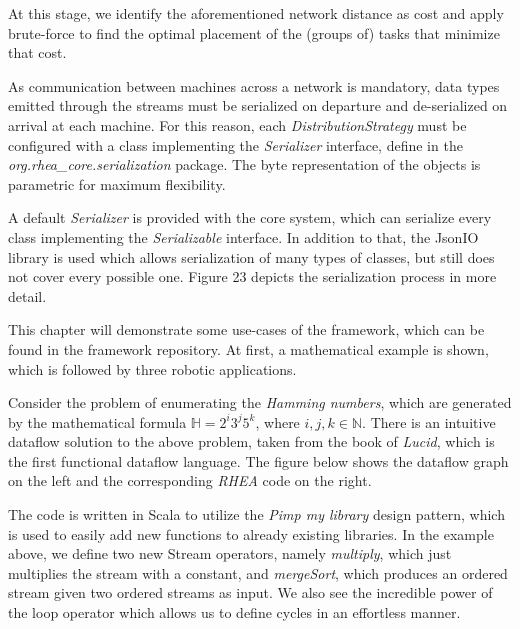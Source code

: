 \documentclass{dithesis}
\begin{document}
At this stage, we identify the aforementioned network distance as cost and apply brute-force to find the optimal placement of the (groups of) tasks that minimize that cost.


As communication between machines across a network is mandatory, data types emitted through the streams must be serialized on departure and de-serialized on arrival at each machine. For this reason, each \textit{DistributionStrategy} must be configured with a class implementing the \textit{Serializer} interface, define in the \textit{org.rhea\_core.serialization} package. The byte representation of the objects is parametric for maximum flexibility. 

A default \textit{Serializer} is provided with the core system, which can serialize every class implementing the \textit{Serializable} interface. In addition to that, the JsonIO library is used which allows serialization of many types of classes, but still does not cover every possible one. Figure 23 depicts the serialization process in more detail.


This chapter will demonstrate some use-cases of the framework, which can be found in the framework repository. At first, a mathematical example is shown, which is followed by three robotic applications. 

Consider the problem of enumerating the \textit{Hamming numbers}, which are generated by the mathematical formula $\mathbb{H} = 2^i3^j5^k$, where $i,j,k \in \mathbb{N}$. There is an intuitive dataflow solution to the above problem, taken from the book of \textit{Lucid}, which is the first functional dataflow language\cite{lucid}. The figure below shows the dataflow graph on the left and the corresponding \textit{RHEA} code on the right.


The code is written in Scala to utilize the \textit{Pimp my library} design pattern\cite{pimp}, which is used to easily add new functions to already existing libraries. In the example above, we define two new Stream operators, namely \textit{multiply}, which just multiplies the stream with a constant, and \textit{mergeSort}, which produces an ordered stream given two ordered streams as input. We also see the incredible power of the loop operator which allows us to define cycles in an effortless manner.
\end{document}
